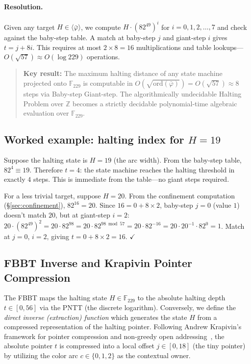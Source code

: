 \paragraph{Resolution.}
Given any target $H \in \langle\bar\varphi\rangle$, we compute
$H \cdot (82^{49})^i$ for $i = 0, 1, 2, \ldots, 7$ and check
against the baby-step table. A match at baby-step $j$ and
giant-step $i$ gives $t = j + 8i$. This requires at most
$2 \times 8 = 16$ multiplications and table lookups---$O(\sqrt{57})
\approx O(\log 229)$ operations.

\begin{quote}
\textbf{Key result:} The maximum halting distance of any state
machine projected onto $\mathbb{F}_{229}$ is computable in
$O(\sqrt{\mathrm{ord}(\bar\varphi)}) = O(\sqrt{57}) \approx 8$
steps via Baby-step Giant-step. The algorithmically undecidable
Halting Problem over $\mathbb{Z}$ becomes a strictly decidable
polynomial-time algebraic evaluation over $\mathbb{F}_{229}$.
\end{quote}

\subsection{Worked example: halting index for $H = 19$}

Suppose the halting state is $H = 19$ (the arc width). From
the baby-step table, $82^4 \equiv 19$. Therefore $t = 4$: the
state machine reaches the halting threshold in exactly $4$ steps.
This is immediate from the table---no giant steps required.

For a less trivial target, suppose $H = 20$. From the
confinement computation (\S\ref{sec:confinement}), $82^{16} = 20$.
Since $16 = 0 + 8 \times 2$, baby-step $j = 0$ (value $1$) doesn't
match $20$, but at giant-step $i = 2$: $20 \cdot (82^{49})^2
= 20 \cdot 82^{98} = 20 \cdot 82^{98 \bmod 57} = 20 \cdot 82^{-16}
= 20 \cdot 20^{-1} \cdot 82^0 = 1$. Match at $j = 0$, $i = 2$,
giving $t = 0 + 8 \times 2 = 16$. $\checkmark$

\subsection{FBBT Inverse and Krapivin Pointer Compression}
\label{subsec:fbbt_inverse_krapivin}

The FBBT maps the halting state $H \in \mathbb{F}_{229}$ to the absolute halting depth $t \in [0, 56]$ via the PNTT (the discrete logarithm). Conversely, we define the \emph{direct inverse (extraction) function} which generates the state $H$ from a compressed representation of the halting pointer. Following Andrew Krapivin's framework for pointer compression and non-greedy open addressing~\cite{krapivin2025optimal}, the absolute pointer $t$ is compressed into a local offset $j \in [0, 18]$ (the tiny pointer) by utilizing the color arc $c \in \{0, 1, 2\}$ as the contextual owner.

